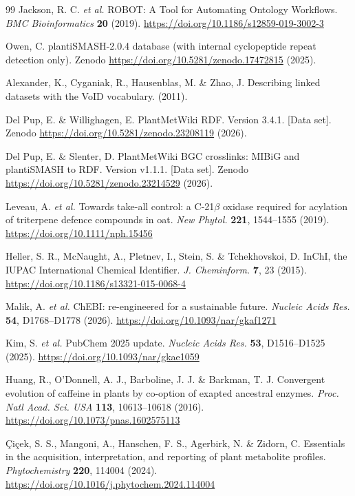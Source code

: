 \documentclass[11pt,a4paper]{article}
\begin{document}
\begin{thebibliography}{99}
Jackson, R. C. \textit{et al.} ROBOT: A Tool for Automating Ontology Workflows. \textit{BMC Bioinformatics} \textbf{20} (2019). \url{https://doi.org/10.1186/s12859-019-3002-3}

Owen, C. plantiSMASH-2.0.4 database (with internal cyclopeptide repeat detection only). Zenodo \url{https://doi.org/10.5281/zenodo.17472815} (2025).

Alexander, K., Cyganiak, R., Hausenblas, M. \& Zhao, J. Describing linked datasets with the VoID vocabulary. (2011).

Del Pup, E. \& Willighagen, E. PlantMetWiki RDF. Version 3.4.1. [Data set]. Zenodo \url{https://doi.org/10.5281/zenodo.23208119} (2026).

Del Pup, E. \& Slenter, D. PlantMetWiki BGC crosslinks: MIBiG and plantiSMASH to RDF. Version v1.1.1. [Data set]. Zenodo \url{https://doi.org/10.5281/zenodo.23214529} (2026).

Leveau, A. \textit{et al.} Towards take-all control: a C-21$\beta$ oxidase required for acylation of triterpene defence compounds in oat. \textit{New Phytol.} \textbf{221}, 1544--1555 (2019). \url{https://doi.org/10.1111/nph.15456}

Heller, S. R., McNaught, A., Pletnev, I., Stein, S. \& Tchekhovskoi, D. InChI, the IUPAC International Chemical Identifier. \textit{J. Cheminform.} \textbf{7}, 23 (2015). \url{https://doi.org/10.1186/s13321-015-0068-4}

Malik, A. \textit{et al.} ChEBI: re-engineered for a sustainable future. \textit{Nucleic Acids Res.} \textbf{54}, D1768--D1778 (2026). \url{https://doi.org/10.1093/nar/gkaf1271}

Kim, S. \textit{et al.} PubChem 2025 update. \textit{Nucleic Acids Res.} \textbf{53}, D1516--D1525 (2025). \url{https://doi.org/10.1093/nar/gkae1059}

Huang, R., O'Donnell, A. J., Barboline, J. J. \& Barkman, T. J. Convergent evolution of caffeine in plants by co-option of exapted ancestral enzymes. \textit{Proc. Natl Acad. Sci. USA} \textbf{113}, 10613--10618 (2016). \url{https://doi.org/10.1073/pnas.1602575113}

\c Ci\c cek, S. S., Mangoni, A., Hanschen, F. S., Agerbirk, N. \& Zidorn, C. Essentials in the acquisition, interpretation, and reporting of plant metabolite profiles. \textit{Phytochemistry} \textbf{220}, 114004 (2024). \url{https://doi.org/10.1016/j.phytochem.2024.114004}


\end{thebibliography}
\end{document}

